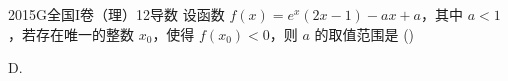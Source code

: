 
\begin{problem}{2015}{G}{全国I卷（理）}{12}{导数}
设函数 $ f(x)=e^x(2x-1)-ax+a $，其中 $ a<1 $，若存在唯一的整数 $ x_0 $，使得 $ f(x_0)<0 $，则 $ a $ 的取值范围是 (\hspace{1cm})
\begin{choices}
\choice{{$\left[-\dfrac{3}{2e},1\right)$}}
\choice{{$\left[-\dfrac{3}{2e},\dfrac{3}{4}\right)$}}
\end{choices}
\end{problem}

\begin{answer}
D.
\end{answer}

